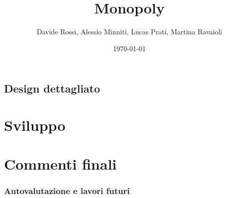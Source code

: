 \documentclass[a4paper,12pt]{report}
\title{Monopoly}
\author{Davide Rossi, Alessio Minniti, Lucas Prati, Martina Ravaioli}
\date{\today}
\begin{document}
\maketitle

\tableofcontents



\section{Design dettagliato}



\chapter{Sviluppo}

\chapter{Commenti finali}
\subsection{Autovalutazione e lavori futuri}

\end{document}
